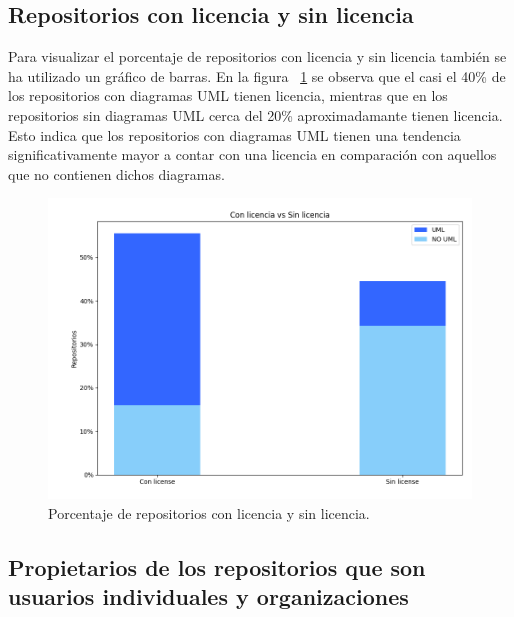 \documentclass[a4paper, 12pt]{book}
\begin{document}
\subsection{Repositorios con licencia y sin licencia}
\label{sec:Gráfico de barras de los repositorios con licencia y sin licencia}

Para visualizar el porcentaje de repositorios con licencia y sin licencia también se ha utilizado un gráfico de barras.
En la figura ~\ref{fig:Figure_license} se observa que el casi el 40\% de los repositorios con diagramas UML tienen licencia, mientras que en los repositorios sin diagramas UML cerca del 20\% aproximadamante tienen licencia.
Esto indica que los repositorios con diagramas UML tienen una tendencia significativamente mayor a contar con una licencia en comparación con aquellos que no contienen dichos diagramas.

\begin{figure}
  \centering
  \includegraphics[width=12cm, keepaspectratio]{img/Figure_license.png}
  \caption{Porcentaje de repositorios con licencia y sin licencia.}\label{fig:Figure_license}
\end{figure}

\subsection{Propietarios de los repositorios que son usuarios individuales y organizaciones}
\label{sec:Gráfico de barras de los propietarios de los repositorios que son usuarios individuales y organizaciones}
\end{document}
